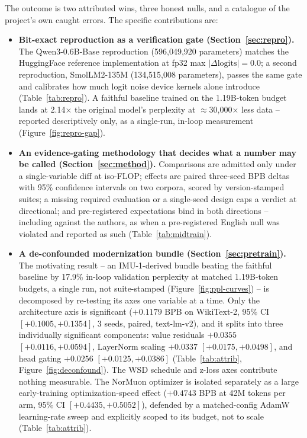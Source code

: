 The outcome is two attributed wins, three honest nulls, and a catalogue of the
project's own caught errors. The specific contributions are:

\begin{itemize}
\item \textbf{Bit-exact reproduction as a verification gate
(Section~\ref{sec:repro}).} The Qwen3-0.6B-Base reproduction (596,049,920
parameters) matches the HuggingFace reference implementation at fp32 max
$|\Delta\mathrm{logits}| = 0.0$; a second reproduction, SmolLM2-135M
(134,515,008 parameters), passes the same gate and calibrates how much logit
noise device kernels alone introduce (Table~\ref{tab:repro}). A faithful
baseline trained on the 1.19B-token budget lands at 2.14$\times$ the original
model's perplexity at $\approx$30,000$\times$ less data -- reported
descriptively only, as a single-run, in-loop measurement
(Figure~\ref{fig:repro-gap}).

\item \textbf{An evidence-gating methodology that decides what a number may be
called (Section~\ref{sec:method}).} Comparisons are admitted only under a
single-variable diff at iso-FLOP; effects are paired three-seed BPB deltas
with 95\% confidence intervals on two corpora, scored by version-stamped
suites; a missing required evaluation or a single-seed design caps a verdict
at directional; and pre-registered expectations bind in both directions --
including against the authors, as when a pre-registered English null was
violated and reported as such (Table~\ref{tab:midtrain}).

\item \textbf{A de-confounded modernization bundle
(Section~\ref{sec:pretrain}).} The motivating result -- an IMU-1-derived
bundle \citep{grigorev2026imu} beating the faithful baseline by 17.9\% in-loop
validation perplexity at matched 1.19B-token budgets, a single run, not
suite-stamped (Figure~\ref{fig:ppl-curves}) -- is decomposed by re-testing its
axes one variable at a time. Only the architecture axis is significant
($+0.1179$ BPB on WikiText-2, 95\% CI $[+0.1005, +0.1354]$, 3 seeds, paired,
text-lm-v2), and it splits into three individually significant components:
value residuals $+0.0355$ $[+0.0116, +0.0594]$, LayerNorm scaling $+0.0337$
$[+0.0175, +0.0498]$, and head gating $+0.0256$ $[+0.0125, +0.0386]$
(Table~\ref{tab:attrib}, Figure~\ref{fig:deconfound}). The WSD schedule and
z-loss axes contribute nothing measurable. The NorMuon optimizer
\citep{li2025normuon} is isolated separately as a large early-training
optimization-speed effect ($+0.4743$ BPB at 42M tokens per arm, 95\% CI
$[+0.4435, +0.5052]$), defended by a matched-config AdamW learning-rate sweep
and explicitly scoped to its budget, not to scale (Table~\ref{tab:attrib}).


\end{itemize}
